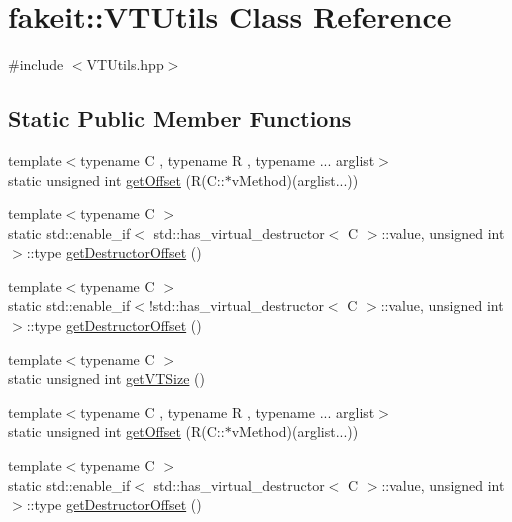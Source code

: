 \hypertarget{classfakeit_1_1VTUtils}{}\section{fakeit\+::V\+T\+Utils Class Reference}
\label{classfakeit_1_1VTUtils}


{\ttfamily \#include $<$V\+T\+Utils.\+hpp$>$}

\subsection*{Static Public Member Functions}
\begin{DoxyCompactItemize}
\item 
{\footnotesize template$<$typename C , typename R , typename ... arglist$>$ }\\static unsigned int \mbox{\hyperlink{classfakeit_1_1VTUtils_a0e019646d770355889228b1d88675530}{get\+Offset}} (R(C\+::$\ast$v\+Method)(arglist...))
\item 
{\footnotesize template$<$typename C $>$ }\\static std\+::enable\+\_\+if$<$ std\+::has\+\_\+virtual\+\_\+destructor$<$ C $>$\+::value, unsigned int $>$\+::type \mbox{\hyperlink{classfakeit_1_1VTUtils_a9c71030f6040b59ec03cbe326ae1d654}{get\+Destructor\+Offset}} ()
\item 
{\footnotesize template$<$typename C $>$ }\\static std\+::enable\+\_\+if$<$!std\+::has\+\_\+virtual\+\_\+destructor$<$ C $>$\+::value, unsigned int $>$\+::type \mbox{\hyperlink{classfakeit_1_1VTUtils_ac13eea89df8b1656a1bedb9a9bb5c518}{get\+Destructor\+Offset}} ()
\item 
{\footnotesize template$<$typename C $>$ }\\static unsigned int \mbox{\hyperlink{classfakeit_1_1VTUtils_a54ddc7bb539671fbf957920f051a6104}{get\+V\+T\+Size}} ()
\item 
{\footnotesize template$<$typename C , typename R , typename ... arglist$>$ }\\static unsigned int \mbox{\hyperlink{classfakeit_1_1VTUtils_a0e019646d770355889228b1d88675530}{get\+Offset}} (R(C\+::$\ast$v\+Method)(arglist...))
\item 
{\footnotesize template$<$typename C $>$ }\\static std\+::enable\+\_\+if$<$ std\+::has\+\_\+virtual\+\_\+destructor$<$ C $>$\+::value, unsigned int $>$\+::type \mbox{\hyperlink{classfakeit_1_1VTUtils_a9c71030f6040b59ec03cbe326ae1d654}{get\+Destructor\+Offset}} ()

\end{DoxyCompactItemize}
